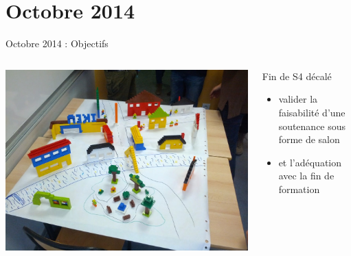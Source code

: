 \documentclass{beamer}
\begin{document}
\section{Octobre 2014}
\begin{frame}{Octobre 2014 : Objectifs}
  \begin{columns}
    \begin{column}{0.5\textwidth}
      \begin{center}
        \includegraphics[width=\textwidth]{includes/2014_S4_lego.jpg}      
      \end{center}
    \end{column}
    \begin{column}{0.5\textwidth}
      Fin de S4 décalé
      \begin{itemize}
        \item valider la faisabilité d'une soutenance sous forme de salon 
        \item et l'adéquation avec la fin de formation
      \end{itemize}
    \end{column}
  \end{columns}
\end{frame}
\end{document}
